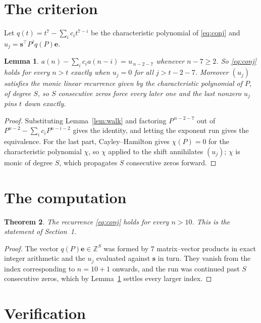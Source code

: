 \documentclass[11pt,a4paper]{article}
\theoremstyle{plain}
\newtheorem{theorem}{Theorem}
\newtheorem{lemma}[theorem]{Lemma}
\theoremstyle{definition}
\begin{document}
\section{The criterion}

Let $q(t)=t^{7}-\sum_i c_i t^{7-i}$ be the characteristic polynomial of
\eqref{eq:conj} and $u_j=\mathbf{s}^{\!\top}P^{j}q(P)\mathbf{e}$.

\begin{lemma}\label{lem:crit}
$a(n)-\sum_i c_i a(n-i)=u_{\,n-2-7}$ whenever $n-7\ge2$. So \eqref{eq:conj}
holds for every $n>t$ exactly when $u_j=0$ for all $j>t-2-7$. Moreover $(u_j)$
satisfies the monic linear recurrence given by the characteristic polynomial of $P$, of
degree $S$, so $S$ consecutive zeros force every later one and the last nonzero $u_j$ pins
$t$ down exactly.
\end{lemma}

\begin{proof}
Substituting Lemma~\ref{lem:walk} and factoring $P^{\,n-2-7}$ out of
$P^{n-2}-\sum_i c_i P^{n-i-2}$ gives the identity, and letting the exponent run gives the
equivalence. For the last part, Cayley--Hamilton gives $\chi(P)=0$ for the characteristic
polynomial $\chi$, so $\chi$ applied to the shift annihilates $(u_j)$; $\chi$ is monic of
degree $S$, which propagates $S$ consecutive zeros forward.
\end{proof}

\section{The computation}

\begin{theorem}
The recurrence \eqref{eq:conj} holds for every $n>10$. This is the statement of
Section~1.
\end{theorem}

\begin{proof}
The vector $q(P)\mathbf{e}\in\mathbb{Z}^{S}$ was formed by $7$ matrix--vector
products in exact integer arithmetic and the $u_j$ evaluated against $\mathbf{s}$ in turn.
They vanish from the index corresponding to $n=10+1$ onwards, and the run was continued
past $S$ consecutive zeros, which by Lemma~\ref{lem:crit} settles every larger index.
\end{proof}

\section{Verification}
\end{document}
